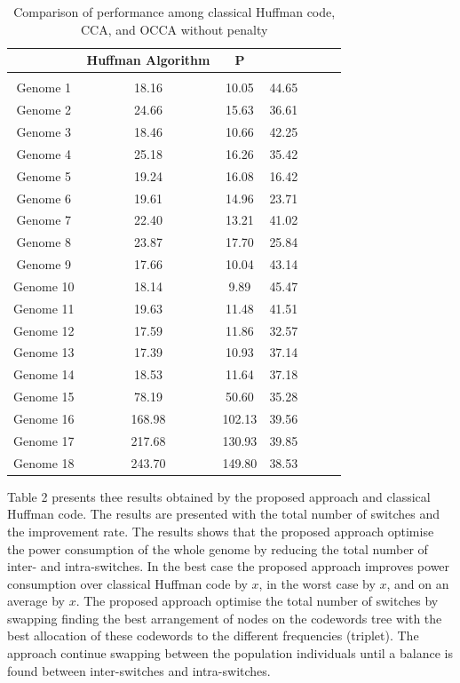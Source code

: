 \documentclass[preprint,12pt]{elsarticle}
\begin{document}
\begin{table}[h]
\renewcommand{\arraystretch}{1.1}
\small
\label{table4}
\caption{Comparison of performance among classical Huffman code, CCA, and OCCA without penalty}

\begin{tabular}{c  c c  c c  c c}
\hline
 & Huffman Algorithm & P \\\hline
\\\hline
Genome 1& 18.16 & 10.05 & 44.65 \\\hline
Genome 2& 24.66 &  15.63 & 36.61 \\\hline
Genome 3&18.46 &  10.66&  42.25\\\hline
Genome 4&25.18&16.26& 35.42\\\hline
Genome 5& 19.24& 16.08 &16.42 \\\hline
Genome 6& 19.61&14.96&23.71\\\hline
Genome 7& 22.40 &13.21&41.02\\\hline
Genome 8&23.87 & 17.70 &25.84\\\hline
Genome 9&17.66 &10.04&43.14\\\hline
Genome 10& 18.14 &9.89& 45.47 \\\hline
Genome 11&19.63&11.48&41.51 \\\hline
Genome 12& 17.59&11.86&32.57 \\\hline
Genome 13& 17.39&10.93&37.14\\\hline
Genome 14&18.53 &11.64&37.18 \\\hline
Genome 15&78.19 &50.60&35.28 \\\hline
Genome 16& 168.98& 102.13&39.56 \\\hline
Genome 17&217.68 &130.93 & 39.85 \\\hline
Genome 18& 243.70& 149.80&38.53 \\\hline
\end{tabular}
\end{table}
Table 2 presents thee results obtained by the proposed approach and classical Huffman code. The results are presented with the total number of switches and the improvement rate. The results shows that the proposed approach optimise the power consumption of the whole genome by reducing the total number of inter- and intra-switches. In the best case the proposed approach improves power consumption over classical Huffman code by $x$, in the worst case by $x$, and on an average by $x$. The proposed approach optimise the total number of switches by swapping finding the best arrangement of nodes on the codewords tree with the best allocation of these codewords to the different frequencies (triplet). The approach continue swapping between the population individuals until a balance is found between inter-switches and intra-switches.
 
\end{document}
